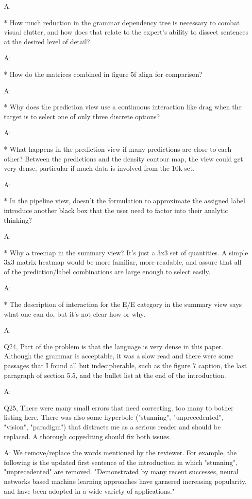 A:

* How much reduction in the grammar dependency tree is necessary to combat visual clutter, and how does that relate to the expert's ability to dissect sentences at the desired level of detail?

A:

* How do the matrices combined in figure 5f align for comparison?

A:

* Why does the prediction view use a continuous interaction like drag when the target is to select one of only three discrete options?

A:

* What happens in the prediction view if many predictions are close to each other? Between the predictions and the density contour map, the view could get very dense, particular if much data is involved from the 10k set.

A:

* In the pipeline view, doesn't the formulation to approximate the assigned label introduce another black box that the user need to factor into their analytic thinking?

A:

* Why a treemap in the summary view? It's just a 3x3 set of quantities. A simple 3x3 matrix heatmap would be more familiar, more readable, and assure that all of the prediction/label combinations are large enough to select easily.

A:

* The description of interaction for the E/E category in the summary view says what one can do, but it's not clear how or why.

A:

Q24, Part of the problem is that the language is very dense in this paper. Although the grammar is acceptable, it was a slow read and there were some passages that I found all but indecipherable, such as the figure 7 caption, the last paragraph of section 5.5, and the bullet list at the end of the introduction.

A:

Q25, There were many small errors that need correcting, too many to bother listing here. There was also some hyperbole ("stunning", "unprecedented", "vision", "paradigm") that distracts me as a serious reader and should be replaced. A thorough copyediting should fix both issues.

A: We remove/replace the words mentioned by the reviewer. For example, the following is the updated first sentence of the introduction in which "stunning", "unprecedented" are removed. "Demonstrated by many recent successes, neural networks based machine learning approaches have garnered increasing popularity, and have been adopted in a wide variety of applications."


